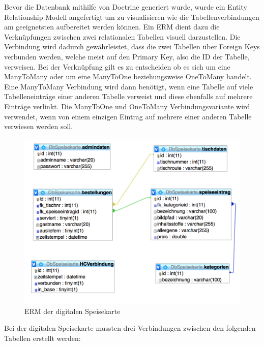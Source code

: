 Bevor die Datenbank mithilfe von Doctrine generiert wurde, wurde ein Entity Relationship Modell angefertigt um zu visualisieren wie die Tabellenverbindungen am geeignetsten aufbereitet werden können. Ein ERM dient dazu die Verknüpfungen zwischen zwei relationalen Tabellen visuell darzustellen. Die Verbindung wird dadurch gewährleistet, dass die zwei Tabellen über Foreign Keys verbunden werden, welche meist auf den Primary Key, also die ID der Tabelle, verweisen. Bei der Verknüpfung gilt es zu entscheiden ob es sich um eine ManyToMany oder um eine ManyToOne beziehungsweise OneToMany handelt. Eine ManyToMany Verbindung wird dann benötigt, wenn eine Tabelle auf viele Tabelleneinträge einer anderen Tabelle verweist und diese ebenfalls auf mehrere Einträge verlinkt. Die ManyToOne und OneToMany Verbindungsvariante wird verwendet, wenn von einem einzigen Eintrag auf mehrere einer anderen Tabelle verwiesen werden soll.
			\begin{figure}[H]
			\begin{centering}
			\includegraphics[width = 1\textwidth]{Bilder/Jok_ERM}
			\par\end{centering}
			\caption{ERM der digitalen Speisekarte}
			\label{ERM der digitalen Speisekarte}
			\end{figure}Bei der digitalen Speisekarte mussten drei Verbindungen zwischen den folgenden Tabellen erstellt werden:
